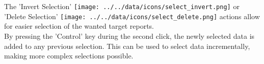 The 'Invert Selection' \texttt{[image: ../../data/icons/select\_invert.png]} or 'Delete Selection' \texttt{[image: ../../data/icons/select\_delete.png]} actions allow for easier selection of the wanted target reports. \\

By pressing the 'Control' key during the second click, the newly selected data is added to any previous selection. This can be used to select data incrementally, making more complex selections possible.
